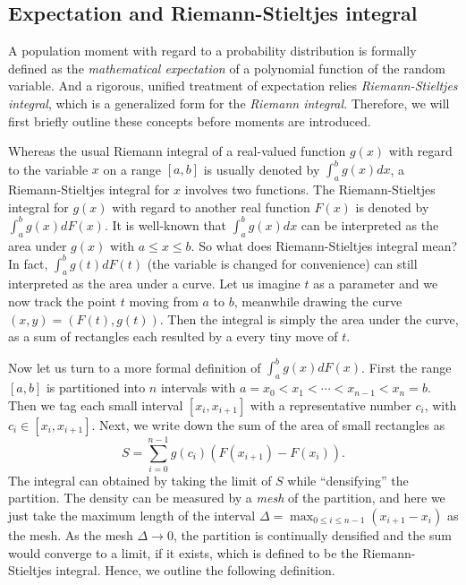 \subsection{Expectation and Riemann-Stieltjes integral}
A population moment with regard to a probability distribution is formally defined as the \textit{mathematical expectation} of a polynomial function of the random variable. And a rigorous, unified treatment of expectation relies \textit{Riemann-Stieltjes integral}, which is a generalized form for the \textit{Riemann integral}. Therefore, we will first briefly outline these concepts before moments are introduced.

Whereas the usual Riemann integral of a real-valued function $ g(x) $ with regard to the variable $ x $ on a range $ [a,b] $ is usually denoted by $ \int_a^b g(x) dx $, a Riemann-Stieltjes integral for $ x $  involves two functions. The Riemann-Stieltjes integral for $ g(x) $ with regard to another real function $ F(x) $ is denoted by $ \int_a^b g(x)dF(x) $. It is well-known that $ \int_a^b g(x) dx $ can be interpreted as the area under $ g(x) $ with $ a \leq x \leq b $. So what does Riemann-Stieltjes integral mean? In fact, $ \int_a^b g(t) dF(t) $ (the variable is changed for convenience) can still interpreted as the area under a curve. Let us imagine $ t $ as a parameter and we now track the point $ t $ moving from $ a $ to $ b $, meanwhile drawing the curve $ (x,y)=(F(t), g(t)) $. Then the integral is simply the area under the curve, as a sum of rectangles each resulted by a every tiny move of $ t $. 

Now let us turn to a more formal definition of $ \int_a^b g(x)dF(x) $. First the range $ [a,b] $ is partitioned into $ n $ intervals with  $ a=x_0 < x_1 < \cdots < x_{n-1} < x_n=b$. Then we tag each small interval $ [x_i, x_{i+1}] $ with a representative number $ c_i $, with $ c_i \in [x_i, x_{i+1}] $. Next, 
we write down the sum of the area of small rectangles as 
\begin{equation}
S = \sum_{i=0}^{n-1} g(c_i) (F(x_{i+1})-F(x_i)).
\end{equation}
The integral can obtained by taking the limit of $ S $ while ``densifying'' the partition. The density can be measured by a \textit{mesh} of the partition, and here we just take the maximum length of the interval $ \Delta = \max_{0 \leq i \leq n-1} (x_{i+1}-x_{i})$ as the mesh. As the mesh $ \Delta \rightarrow 0 $, the partition is continually densified and the sum would converge to a limit, if it exists, which is defined to be the Riemann-Stieltjes integral. Hence, we outline the following definition. 

